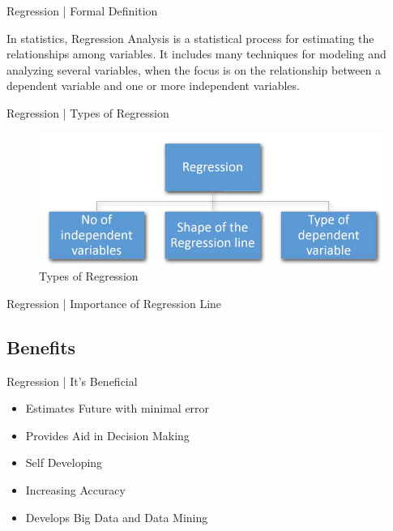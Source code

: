 \documentclass[10pt]{beamer}
\begin{document}
	\begin{frame}[c]{Regression | Formal Definition}
		\begin{center}
			\large{In statistics,}
			\Large{ Regression Analysis}\large{ is a statistical process for estimating the relationships among variables. It includes many techniques for modeling and analyzing several variables, when the focus is on the relationship between a dependent variable and one or more independent variables.
			}
		\end{center}
	\end{frame}
	
	\begin{frame}[c]{Regression | Types of Regression}
		\begin{figure}
			\begin{center}
				\includegraphics[scale=0.35]{images/regt}
			\end{center}
			\caption{Types of Regression}
		\end{figure}
	\end{frame}
	
	\begin{frame}[c]{Regression | Importance of Regression Line}
		\begin{center}
		\end{center}
	\end{frame}
	
	\subsection{Benefits}
	\begin{frame}{Regression | It's Beneficial }
		\Large{}
		\begin{itemize}
			\item<1-> Estimates Future with minimal error
			\item<2-> Provides Aid in Decision Making
			\item<3-> Self Developing
			\item<4-> Increasing Accuracy
			\item<5-> Develops Big Data and Data Mining   
		\end{itemize}	
	\end{frame}
	
\end{document}
